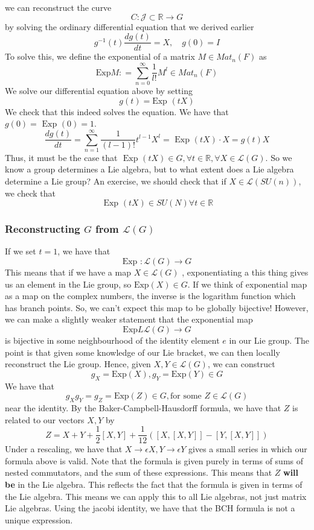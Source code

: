\documentclass[11pt, oneside]{article}   	%
\theoremstyle{slanted}
\begin{document}
we can reconstruct the curve 
\[
	C : \mathcal{ J } \subset \mathbb{ R} \rightarrow G 
\] by solving the ordinary differential equation that we derived earlier
\[
	g ^{ -1 } ( t) \frac{ d g( t) }{ dt } =  X, \quad g ( 0 ) = I  
\]  To solve this, we define the exponential of a matrix 
$ M \in Mat_ n ( F) $ as 
\[
	\text{Exp} M : = \sum_{n=0}^{\infty} \frac{1}{l ! } M ^ l \in Mat_n ( F) 
\] 
We solve our differential equation above by 
setting 
\[
	g ( t) = \text{Exp } ( tX) 
\] We check that this indeed solves the equation. 
We have that $ g ( 0 ) = \text{ Exp } ( 0 ) = 1$. 
\[
	\frac{dg ( t) }{ dt }  =  \sum_{n=1}^{\infty} \frac{1}{( l - 1 ) ! } t ^{ l - 1} X^ l = \text{ Exp } ( tX) \cdot X = g ( t) X 
\] Thus, it must be the case that 
$ \text{ Exp } ( tX ) \in G, \forall t \in \mathbb{ R} , \forall X \in \mathcal{ L } ( G )$. 
So we know a group determines a Lie algebra, but 
to what extent does a Lie algebra determine a Lie group? 
An exercise, we should check that 
if $ X \in \mathcal{ L } ( SU ( n ) ) $, we check that 
\[
	\text{ Exp } ( t X ) \in SU ( N ) \forall t \in \mathbb{ R} 	
\] 

\subsubsection{Reconstructing $ G $ from  $ \mathcal{ L } ( G ) $} 
If we set $ t = 1$, 
we have that 
 \[
	 \text{Exp } : \mathcal{ L  }( G ) \to G 
\]
This means that if we have a map $ X \in \mathcal{ L } ( G ) $ , 
exponentiating a this thing gives us an element in the Lie group, so $ \text{Exp} ( X) \in G $. 
If we think of exponential map as a map on the complex numbers, 
the inverse is the logarithm function which has branch points. 
So, we can't expect this map to be globally bijective! 
However, we can make a slightly weaker statement that the exponential map 
\[
	\text{Exp} L \mathcal{ L } ( G ) \to G 
\]  is bijective in some neighbourhood of the 
identity element $ e $ in our Lie group. 
The point is that given some knowledge of our Lie bracket, 
we can then locally reconstruct the Lie group. 
Hence, given $ X, Y \in \mathcal{ L } ( G)  $, we can 
construct 
\[
	g_{ X }  = \text{Exp} ( X) , g_Y  = \text{Exp} (Y) \in G 
\] We have that 
\[
	g_X g_Y  = g_Z = \text{Exp} ( Z ) \in G, \text{for some } Z \in \mathcal{L }(G ) 	 
\] near the identity. 
By the Baker-Campbell-Hausdorff formula, 
we have that $ Z $ is related to our vectors $ X, Y $ by 
\[
	Z = X + Y + \frac{1}{2 } [ X, Y ] + \frac{1}{12 } \left( [ X, [ X, Y ] ] - [ Y , [ X, Y ] ]  \right) 
\] Under a rescaling, we have that 
$ X \to \epsilon  X , Y \to \epsilon Y $  gives a small series in which 
our formula above is valid. 
Note that the formula is given purely in terms of sums of nested commutators, 
and the sum of these expressions. This means that $ Z $ \textbf{will be } in the 
Lie algebra. 
This reflects the fact that the formula is given in terms of the Lie algebra. 
This means we can apply this to all Lie algebras, 
not just matrix Lie algebras. 
Using the jacobi identity, we have that the BCH formula is 
not a unique expression. 
\end{document}
